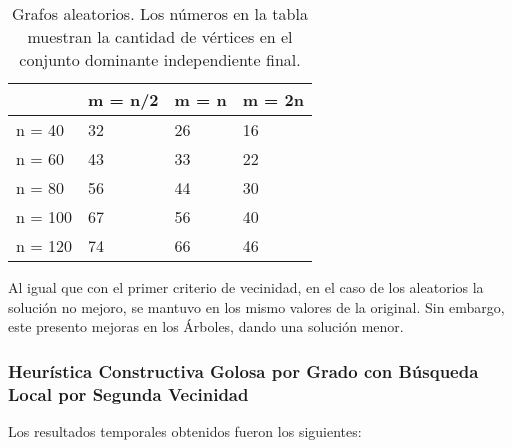 \begin{table}[H]
\centering
\label{my-label}
\begin{tabular}{|l|lll|}
\hline
        & \multicolumn{1}{l|}{m = n/2} & \multicolumn{1}{l|}{m = n} & m = 2n \\ \hline
n = 40  & 32                           & 26                         & 16     \\ \cline{1-1}
n = 60  & 43                           & 33                         & 22     \\ \cline{1-1}
n = 80  & 56                           & 44                         & 30     \\ \cline{1-1}
n = 100 & 67                           & 56                         & 40     \\ \cline{1-1}
n = 120 & 74                           & 66                         & 46     \\ \hline
\end{tabular}
\caption{Grafos aleatorios. Los números en la tabla muestran la cantidad de vértices en el conjunto dominante independiente final.}
\end{table}

Al igual que con el primer criterio de vecinidad, en el caso de los aleatorios la solución no mejoro, se mantuvo en los mismo valores de la original. Sin embargo, este presento mejoras en los Árboles, dando una solución menor.

\subsubsection{Heurística Constructiva Golosa por Grado con Búsqueda Local por Segunda Vecinidad}

Los resultados temporales obtenidos fueron los siguientes:

